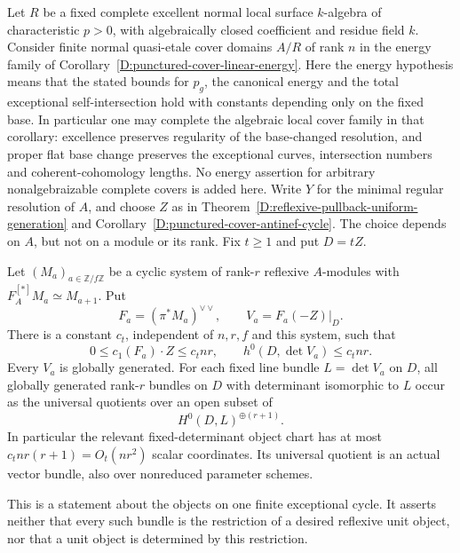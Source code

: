 \begin{proposition}
\label{D:hereditary-fixed-determinant-cycle-chart}
Let $R$ be a fixed complete excellent normal local surface
$k$-algebra of characteristic $p>0$, with algebraically closed
coefficient and residue field $k$. Consider finite normal
quasi-etale cover domains $A/R$ of rank $n$ in the energy
family of Corollary~\ref{D:punctured-cover-linear-energy}.
Here the energy hypothesis means that the stated bounds for
$p_g$, the canonical energy and the total exceptional
self-intersection hold with constants depending only on
the fixed base. In particular one may complete the algebraic
local cover family in that corollary: excellence preserves
regularity of the base-changed resolution, and proper flat
base change preserves the exceptional curves, intersection
numbers and coherent-cohomology lengths. No energy assertion
for arbitrary nonalgebraizable complete covers is added here.
Write $Y$ for the minimal regular resolution of $A$,
and choose $Z$ as in Theorem~\ref{D:reflexive-pullback-uniform-generation}
and Corollary~\ref{D:punctured-cover-antinef-cycle}.
The choice depends on $A$, but not on a module or its rank.
Fix $t\ge1$ and put $D=tZ$.

Let $(M_a)_{a\in\mathbb Z/f\mathbb Z}$ be a cyclic system of
rank-$r$ reflexive $A$-modules with
$F_A^{[*]}M_a\simeq M_{a+1}$. Put
\[
       F_a=(\pi^*M_a)^{\vee\vee},\qquad V_a=F_a(-Z)|_D.
\]
There is a constant $c_t$, independent of $n,r,f$ and this
system, such that
\[
 0\le c_1(F_a)\cdot Z\le c_tnr,
 \qquad h^0(D,\det V_a)\le c_tnr.                    \tag{D.UG.9}
\]
Every $V_a$ is globally generated. For each fixed line bundle
$L=\det V_a$ on $D$, all globally generated rank-$r$ bundles
on $D$ with determinant isomorphic to $L$ occur as the
universal quotients over an open subset of
\[
                 H^0(D,L)^{\oplus(r+1)}.
                                                               \tag{D.UG.10}
\]
In particular the relevant fixed-determinant object chart has
at most $c_tnr(r+1)=O_t(nr^2)$ scalar coordinates. Its universal
quotient is an actual vector bundle, also over nonreduced
parameter schemes.

This is a statement about the objects on one finite exceptional
cycle. It asserts neither that every such bundle is the
restriction of a desired reflexive unit object, nor that a
unit object is determined by this restriction.
\end{proposition}


